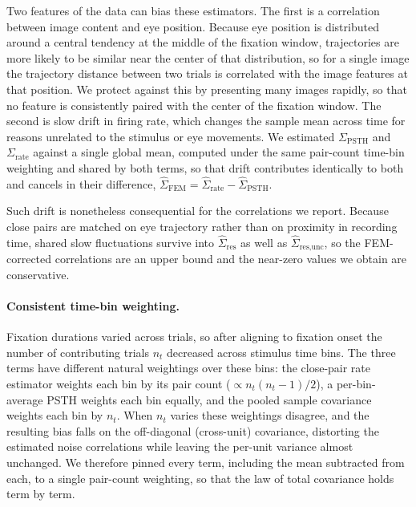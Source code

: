 \documentclass{lite}
\newcommand{\Cpsth}{\Sigma_{\text{PSTH}}}
\newcommand{\Crate}{\Sigma_{\text{rate}}}
\begin{document}
Two features of the data can bias these estimators. The first is a correlation between image content and eye position. Because eye position is distributed around a central tendency at the middle of the fixation window, trajectories are more likely to be similar near the center of that distribution, so for a single image the trajectory distance between two trials is correlated with the image features at that position. We protect against this by presenting many images rapidly, so that no feature is consistently paired with the center of the fixation window. The second is slow drift in firing rate, which changes the sample mean across time for reasons unrelated to the stimulus or eye movements. We estimated $\Cpsth$ and $\Crate$ against a single global mean, computed under the same pair-count time-bin weighting and shared by both terms, so that drift contributes identically to both and cancels in their difference, $\hat{\Sigma}_{\mathrm{FEM}} = \hat{\Sigma}_{\mathrm{rate}} - \hat{\Sigma}_{\mathrm{PSTH}}$.

Such drift is nonetheless consequential for the correlations we report. Because close pairs are matched on eye trajectory rather than on proximity in recording time, shared slow fluctuations survive into $\hat{\Sigma}_{\mathrm{res}}$ as well as $\hat{\Sigma}_{\text{res}, \text{unc}}$, so the FEM-corrected correlations are an upper bound and the near-zero values we obtain are conservative.

\paragraph{Consistent time-bin weighting.} Fixation durations varied across trials, so after aligning to fixation onset the number of contributing trials $n_t$ decreased across stimulus time bins. The three terms have different natural weightings over these bins: the close-pair rate estimator weights each bin by its pair count ($\propto n_t(n_t-1)/2$), a per-bin-average PSTH weights each bin equally, and the pooled sample covariance weights each bin by $n_t$. When $n_t$ varies these weightings disagree, and the resulting bias falls on the off-diagonal (cross-unit) covariance, distorting the estimated noise correlations while leaving the per-unit variance almost unchanged. We therefore pinned every term, including the mean subtracted from each, to a single pair-count weighting, so that the law of total covariance holds term by term.
\end{document}
